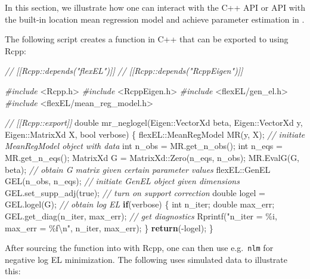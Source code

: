 \documentclass[article]{jss}
\newenvironment{Shaded}{\begin{snugshade}}{\end{snugshade}}
\newcommand{\CommentTok}[1]{\textcolor[rgb]{0.56,0.35,0.01}{\textit{#1}}}
\newcommand{\ControlFlowTok}[1]{\textcolor[rgb]{0.13,0.29,0.53}{\textbf{#1}}}
\newcommand{\DataTypeTok}[1]{\textcolor[rgb]{0.13,0.29,0.53}{#1}}
\newcommand{\ImportTok}[1]{#1}
\newcommand{\NormalTok}[1]{#1}
\newcommand{\PreprocessorTok}[1]{\textcolor[rgb]{0.56,0.35,0.01}{\textit{#1}}}
\newcommand{\SpecialCharTok}[1]{\textcolor[rgb]{0.00,0.00,0.00}{#1}}
\newcommand{\StringTok}[1]{\textcolor[rgb]{0.31,0.60,0.02}{#1}}
\renewcommand{\|}{\,|\,}
\begin{document}
In this section, we illustrate how one can interact with the C++ API or  API with the built-in location mean regression model and achieve parameter estimation in .

The following script creates a function in C++ that can be exported to  using Rcpp:

\begin{Shaded}
\begin{Highlighting}[]
\CommentTok{// [[Rcpp::depends("flexEL")]]}
\CommentTok{// [[Rcpp::depends("RcppEigen")]]}

\PreprocessorTok{\#include }\ImportTok{\textless{}Rcpp.h\textgreater{}}
\PreprocessorTok{\#include }\ImportTok{\textless{}RcppEigen.h\textgreater{}}
\PreprocessorTok{\#include }\ImportTok{\textless{}flexEL/gen\_el.h\textgreater{}}
\PreprocessorTok{\#include }\ImportTok{\textless{}flexEL/mean\_reg\_model.h\textgreater{}}

\CommentTok{// [[Rcpp::export]]}
\DataTypeTok{double}\NormalTok{ mr\_neglogel(Eigen::VectorXd beta,}
\NormalTok{                   Eigen::VectorXd y,}
\NormalTok{                   Eigen::MatrixXd X,}
                   \DataTypeTok{bool}\NormalTok{ verbose) \{}
\NormalTok{  flexEL::MeanRegModel MR(y, X); }\CommentTok{// initiate MeanRegModel object with data}
  \DataTypeTok{int}\NormalTok{ n\_obs = MR.get\_n\_obs();}
  \DataTypeTok{int}\NormalTok{ n\_eqs = MR.get\_n\_eqs();}
\NormalTok{  MatrixXd G = MatrixXd::Zero(n\_eqs, n\_obs);}
\NormalTok{  MR.EvalG(G, beta); }\CommentTok{// obtain G matrix given certain parameter values}
\NormalTok{  flexEL::GenEL GEL(n\_obs, n\_eqs); }\CommentTok{// initiate GenEL object given dimensions}
\NormalTok{  GEL.set\_supp\_adj(true); }\CommentTok{// turn on support correction}
  \DataTypeTok{double}\NormalTok{ logel = GEL.logel(G); }\CommentTok{// obtain log EL}
  \ControlFlowTok{if}\NormalTok{(verbose) \{}
    \DataTypeTok{int}\NormalTok{ n\_iter;}
    \DataTypeTok{double}\NormalTok{ max\_err;}
\NormalTok{    GEL.get\_diag(n\_iter, max\_err); }\CommentTok{// get diagnostics}
\NormalTok{    Rprintf(}\StringTok{"n\_iter = \%i, max\_err = \%f}\SpecialCharTok{\textbackslash{}n}\StringTok{"}\NormalTok{, n\_iter, max\_err);}
\NormalTok{  \}}
  \ControlFlowTok{return}\NormalTok{({-}logel);}
\NormalTok{\}}
\end{Highlighting}
\end{Shaded}

After sourcing the function into  with Rcpp, one can then use e.g.~\texttt{nlm} for negative log EL minimization. The following uses simulated data to illustrate this:
\end{document}
